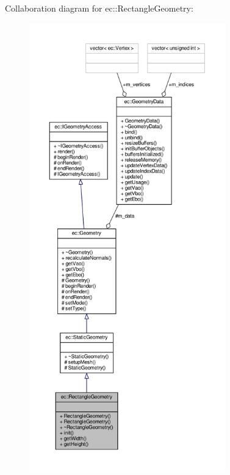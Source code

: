 Collaboration diagram for ec\+:\+:Rectangle\+Geometry\+:\nopagebreak
\begin{figure}[H]
\begin{center}
\leavevmode
\includegraphics[height=550pt]{classec_1_1_rectangle_geometry__coll__graph}
\end{center}
\end{figure}
